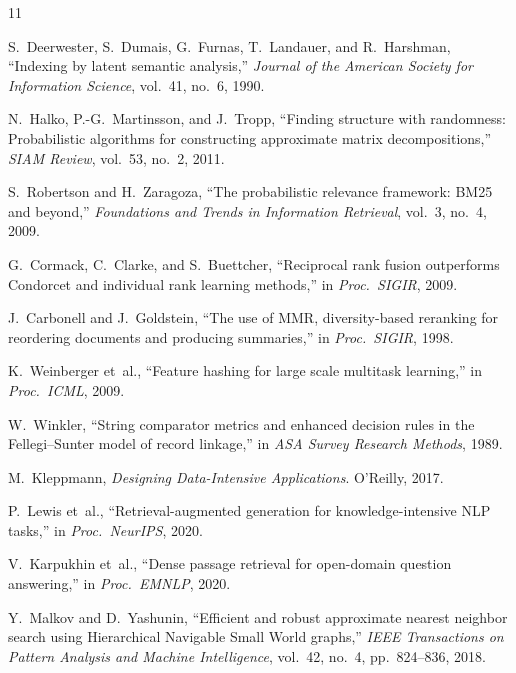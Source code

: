 \begin{thebibliography}{11}

S.~Deerwester, S.~Dumais, G.~Furnas, T.~Landauer, and R.~Harshman,
``Indexing by latent semantic analysis,'' \emph{Journal of the American
Society for Information Science}, vol.~41, no.~6, 1990.

N.~Halko, P.-G.~Martinsson, and J.~Tropp, ``Finding structure with
randomness: Probabilistic algorithms for constructing approximate matrix
decompositions,'' \emph{SIAM Review}, vol.~53, no.~2, 2011.

S.~Robertson and H.~Zaragoza, ``The probabilistic relevance framework: BM25
and beyond,'' \emph{Foundations and Trends in Information Retrieval},
vol.~3, no.~4, 2009.

G.~Cormack, C.~Clarke, and S.~Buettcher, ``Reciprocal rank fusion outperforms
Condorcet and individual rank learning methods,'' in \emph{Proc.\ SIGIR},
2009.

J.~Carbonell and J.~Goldstein, ``The use of MMR, diversity-based reranking
for reordering documents and producing summaries,'' in \emph{Proc.\ SIGIR},
1998.

K.~Weinberger et~al., ``Feature hashing for large scale multitask learning,''
in \emph{Proc.\ ICML}, 2009.

W.~Winkler, ``String comparator metrics and enhanced decision rules in the
Fellegi--Sunter model of record linkage,'' in \emph{ASA Survey Research
Methods}, 1989.

M.~Kleppmann, \emph{Designing Data-Intensive Applications}. O'Reilly, 2017.

P.~Lewis et~al., ``Retrieval-augmented generation for knowledge-intensive NLP
tasks,'' in \emph{Proc.\ NeurIPS}, 2020.

V.~Karpukhin et~al., ``Dense passage retrieval for open-domain question
answering,'' in \emph{Proc.\ EMNLP}, 2020.

Y.~Malkov and D.~Yashunin, ``Efficient and robust approximate nearest
neighbor search using Hierarchical Navigable Small World graphs,''
\emph{IEEE Transactions on Pattern Analysis and Machine Intelligence},
vol.~42, no.~4, pp.~824--836, 2018.

\end{thebibliography}
